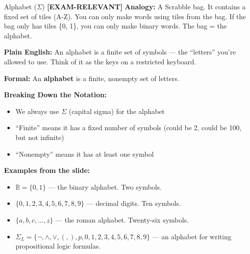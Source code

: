 \documentclass[11pt,a4paper]{article}
\newcommand{\kemark}{\textcolor{red!70!black}{\textbf{[EXAM-RELEVANT]}}}
\begin{document}
\begin{definitionbox}{Alphabet ($\Sigma$) \kemark}
\textbf{Analogy:} A Scrabble bag. It contains a fixed set of tiles (A-Z). You can only make words using tiles from the bag. If the bag only has tiles \{0, 1\}, you can only make binary words. The bag = the alphabet.

\textbf{Plain English:} An alphabet is a finite set of symbols --- the ``letters'' you're allowed to use. Think of it as the keys on a restricted keyboard.

\textbf{Formal:} An \textbf{alphabet} is a finite, nonempty set of letters.

\textbf{Breaking Down the Notation:}
\begin{itemize}[nosep]
\item We always use $\Sigma$ (capital sigma) for the alphabet
\item ``Finite'' means it has a fixed number of symbols (could be 2, could be 100, but not infinite)
\item ``Nonempty'' means it has at least one symbol
\end{itemize}

\textbf{Examples from the slide:}
\begin{itemize}[nosep]
\item $\mathbb{B} = \{0, 1\}$ --- the binary alphabet. Two symbols.
\item $\{0, 1, 2, 3, 4, 5, 6, 7, 8, 9\}$ --- decimal digits. Ten symbols.
\item $\{a, b, c, \ldots, z\}$ --- the roman alphabet. Twenty-six symbols.
\item $\Sigma_L = \{\neg, \land, \lor, (, ), p, 0, 1, 2, 3, 4, 5, 6, 7, 8, 9\}$ --- an alphabet for writing propositional logic formulas.
\end{itemize}
\end{definitionbox}
\end{document}
